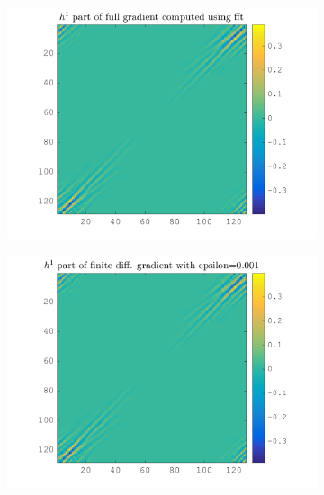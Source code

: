 \begin{figure}[!ht]\centering
\begin{subfigure}[b]{0.40\textwidth}\centering
\includegraphics[width=\textwidth]{figures/verif_gradient/gradient.png}
\end{subfigure}
\begin{subfigure}[b]{0.40\textwidth}\centering
\includegraphics[width=\textwidth]{figures/verif_gradient/finite-diff.png}
\end{subfigure}
\begin{subfigure}[b]{0.40\textwidth}\centering

\end{subfigure}
\end{figure}
